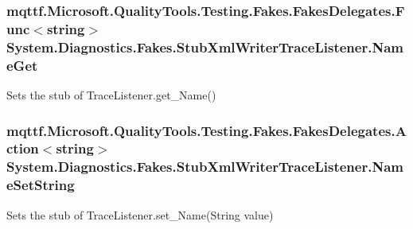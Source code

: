 \hypertarget{class_system_1_1_diagnostics_1_1_fakes_1_1_stub_xml_writer_trace_listener_a8d94c999b8414a0d2b3cf4c081e927bf}{
\subsubsection[{Name\-Get}]{\setlength{\rightskip}{0pt plus 5cm}mqttf.\-Microsoft.\-Quality\-Tools.\-Testing.\-Fakes.\-Fakes\-Delegates.\-Func$<$string$>$ System.\-Diagnostics.\-Fakes.\-Stub\-Xml\-Writer\-Trace\-Listener.\-Name\-Get}}\label{class_system_1_1_diagnostics_1_1_fakes_1_1_stub_xml_writer_trace_listener_a8d94c999b8414a0d2b3cf4c081e927bf}


Sets the stub of Trace\-Listener.\-get\-\_\-\-Name()

\hypertarget{class_system_1_1_diagnostics_1_1_fakes_1_1_stub_xml_writer_trace_listener_a9d6b52ecf4fe51eea1b3575b8dfbf069}{
\subsubsection[{Name\-Set\-String}]{\setlength{\rightskip}{0pt plus 5cm}mqttf.\-Microsoft.\-Quality\-Tools.\-Testing.\-Fakes.\-Fakes\-Delegates.\-Action$<$string$>$ System.\-Diagnostics.\-Fakes.\-Stub\-Xml\-Writer\-Trace\-Listener.\-Name\-Set\-String}}\label{class_system_1_1_diagnostics_1_1_fakes_1_1_stub_xml_writer_trace_listener_a9d6b52ecf4fe51eea1b3575b8dfbf069}


Sets the stub of Trace\-Listener.\-set\-\_\-\-Name(\-String value)

